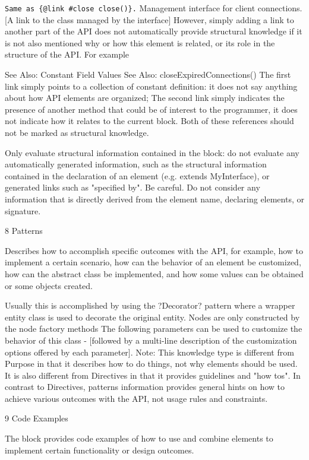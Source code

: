 \verb|Same as {@link #close close()}.|
Management interface for client connections. [A link to the class managed by the interface]
However, simply adding a link to another part of the API does not automatically provide structural knowledge if it is not also mentioned why or how this element is related, or its role in the structure of the API. For example

See Also: Constant Field Values
See Also: closeExpiredConnections()
The first link simply points to a collection of constant definition: it does not say anything about how API elements are organized; The second link simply indicates the presence of another method that could be of interest to the programmer, it does not indicate how it relates to the current block. Both of these references should not be marked as structural knowledge.

Only evaluate structural information contained in the block: do not evaluate any automatically generated information, such as the structural information contained in the declaration of an element (e.g. extends MyInterface), or generated links such as "specified by". Be careful. Do not consider any information that is directly derived from the element name, declaring elements, or signature.

8 Patterns

Describes how to accomplish specific outcomes with the API, for example, how to implement a certain scenario, how can the behavior of an element be customized, how can the abstract class be implemented, and how some values can be obtained or some objects created.

Usually this is accomplished by using the ?Decorator? pattern where a wrapper entity class is used to decorate the original entity.
Nodes are only constructed by the node factory methods
The following parameters can be used to customize the behavior of this class - [followed by a multi-line description of the customization options offered by each parameter].
Note: This knowledge type is different from Purpose in that it describes how to do things, not why elements should be used. It is also different from Directives in that it provides guidelines and "how tos". In contrast to Directives, patterns information provides general hints on how to achieve various outcomes with the API, not usage rules and constraints.

9 Code Examples

The block provides code examples of how to use and combine elements to implement certain functionality or design outcomes.


